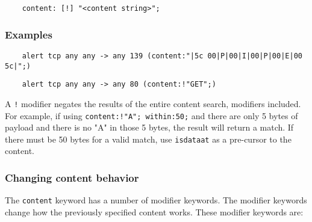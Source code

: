 \documentclass[english]{report}
\newenvironment{note}{
\samepage
    \vspace{10pt}{\textsf{
        {\hspace{7pt}\Huge{$\triangle$\hspace{-12.5pt}{\Large{$^!$}}}}\hspace{5pt}
        {\Large{NOTE}}
    }
    }
   \begin{center}
    \par\vspace{-17pt}

    \begin{lrbox}{\savepar}
    \begin{minipage}[r]{6in}
}
{
    \end{minipage}
    \end{lrbox}
    \fbox{
        \usebox{
            \savepar
	}
    }
    \par\vskip10pt
    \end{center}
}
\newenvironment{note}{
        \begin{rawhtml}
        <p><table border="1"><tr><td><b>
        Note:&nbsp;&nbsp;</b>
        \end{rawhtml}
}{
        \begin{rawhtml}
        </b></td></tr></table></p>
        \end{rawhtml}
}
\begin{document}
\begin{verbatim}
    content: [!] "<content string>";
\end{verbatim}

\subsubsection{Examples}

\begin{verbatim}
    alert tcp any any -> any 139 (content:"|5c 00|P|00|I|00|P|00|E|00 5c|";)
\end{verbatim}

\begin{verbatim}
    alert tcp any any -> any 80 (content:!"GET";)
\end{verbatim}

\begin{note}

A \texttt{!} modifier negates the results of the entire content search,
modifiers included.  For example, if using \texttt{content:!"A"; within:50;}
and there are only 5 bytes of payload and there is no "A" in those 5 bytes, the
result will return a match.  If there must be 50 bytes for a valid match, use
\texttt{isdataat} as a pre-cursor to the content.

\end{note}

\subsubsection{Changing content behavior}

The \texttt{content} keyword has a number of modifier keywords.  The modifier
keywords change how the previously specified content works.  These modifier
keywords are:
\end{document}
